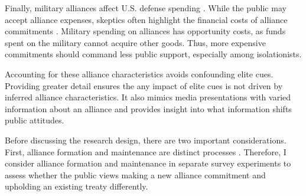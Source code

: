 \documentclass[12pt]{article}
\begin{document}
Finally, military alliances affect U.S. defense spending \citep{AlleyFuhrmann2021}. 
While the public may accept alliance expenses, skeptics often highlight the financial costs of alliance commitments \citep{Posen2014}. 
Military spending on alliances has opportunity costs, as funds spent on the military cannot acquire other goods. 
Thus, more expensive commitments should command less public support, especially among isolationists. 

 
Accounting for these alliance characteristics avoids confounding elite cues. 
Providing greater detail ensures the any impact of elite cues is not driven by inferred alliance characteristics.
It also mimics media presentations with varied information about an alliance and provides insight into what information shifts public attitudes. 


Before discussing the research design, there are two important considerations. 
First, alliance formation and maintenance are distinct processes \citep{Snyder1997}. 
Therefore, I consider alliance formation and maintenance in separate survey experiments to assess whether the public views making a new alliance commitment and upholding an existing treaty differently. 


%
%
%
%
%
\end{document}
